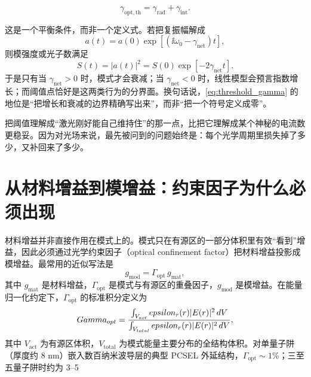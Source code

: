 \begin{equation}
\gamma_{\mathrm{opt,th}} = \gamma_{\mathrm{rad}} + \gamma_{\mathrm{int}}.
\label{eq:threshold_gamma}
\end{equation}

这是一个平衡条件，而非一个定义式。若把复振幅解成
\[
a(t)=a(0)\exp\!\left[\left(\ii\omega_0-\gamma_{\mathrm{net}}\right)t\right],
\]
则模强度或光子数满足
\begin{equation}
S(t)=|a(t)|^2
=
S(0)\exp\!\left[-2\gamma_{\mathrm{net}}t\right].
\label{eq:s_from_a}
\end{equation}
于是只有当 $\gamma_{\mathrm{net}}>0$ 时，模式才会衰减；当 $\gamma_{\mathrm{net}}<0$ 时，线性模型会预言指数增长；而阈值点恰好是这两类行为的分界面。换句话说，\cref{eq:threshold_gamma} 的地位是“把增长和衰减的边界精确写出来”，而非“把一个符号定义成零”。

\begin{IntuitionBox}
把阈值理解成“激光刚好能自己维持住”的那一点，比把它理解成某个神秘的电流数更稳妥。因为对光场来说，最先被问到的问题始终是：每个光学周期里损失掉了多少，又补回来了多少。
\end{IntuitionBox}

\section{从材料增益到模增益：约束因子为什么必须出现}
材料增益并非直接作用在模式上的。模式只在有源区的一部分体积里有效“看到”增益，因此必须通过光学约束因子（optical confinement factor）把材料增益投影成模增益。最常用的近似写法是
\begin{equation}
g_{\mathrm{mod}} = \Gamma_{\mathrm{opt}}\, g_{\mathrm{mat}},
\label{eq:gmod_gamma}
\end{equation}
其中 $g_{\mathrm{mat}}$ 是材料增益，$\Gamma_{\mathrm{opt}}$ 是模式与有源区的重叠因子，$g_{\mathrm{mod}}$ 是模增益。在能量归一化约定下，$\Gamma_{\mathrm{opt}}$ 的标准积分定义为
\begin{equation}
Gamma_{opt}=
\frac{\int_{V_{act}}epsilon_r(r)|E(r)|^2\,dV}
{\int_{V_{total}}epsilon_r(r)|E(r)|^2\,dV},
\label{eq:gamma_opt_def}
\end{equation}
其中 $V_{\mathrm{act}}$ 为有源区体积，$V_{\mathrm{total}}$ 为模式能量主要分布的全结构体积。对单量子阱（厚度约 8 nm）嵌入数百纳米波导层的典型 PCSEL 外延结构，$\Gamma_{\mathrm{opt}}\sim1\%$；三至五量子阱时约为 3--5%

